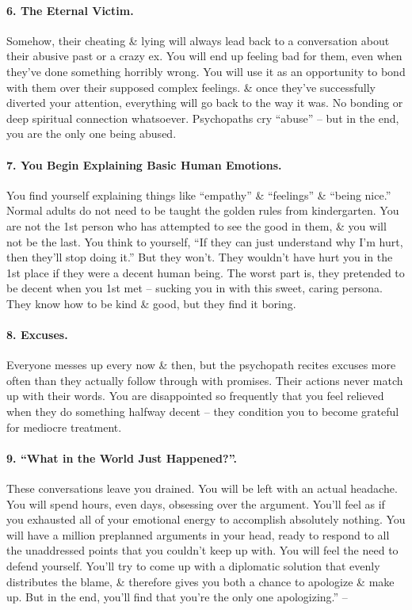 \documentclass{article}
\numberwithin{equation}{section}
\begin{document}
\paragraph{6. The Eternal Victim.} Somehow, their cheating \& lying will always lead back to a conversation about their abusive past or a crazy ex. You will end up feeling bad for them, even when they've done something horribly wrong. You will use it as an opportunity to bond with them over their supposed complex feelings. \& once they've successfully diverted your attention, everything will go back to the way it was. No bonding or deep spiritual connection whatsoever. Psychopaths cry ``abuse'' -- but in the end, you are the only one being abused.

\paragraph{7. You Begin Explaining Basic Human Emotions.} You find yourself explaining things like ``empathy'' \& ``feelings'' \& ``being nice.'' Normal adults do not need to be taught the golden rules from kindergarten. You are not the 1st person who has attempted to see the good in them, \& you will not be the last. You think to yourself, ``If they can just understand why I'm hurt, then they'll stop doing it.'' But they won't. They wouldn't have hurt you in the 1st place if they were a decent human being. The worst part is, they pretended to be decent when you 1st met -- sucking you in with this sweet, caring persona. They know how to be kind \& good, but they find it boring.

\paragraph{8. Excuses.} Everyone messes up every now \& then, but the psychopath recites excuses more often than they actually follow through with promises. Their actions never match up with their words. You are disappointed so frequently that you feel relieved when they do something halfway decent -- they condition you to become grateful for mediocre treatment.

\paragraph{9. ``What in the World Just Happened?''.} These conversations leave you drained. You will be left with an actual headache. You will spend hours, even days, obsessing over the argument. You'll feel as if you exhausted all of your emotional energy to accomplish absolutely nothing. You will have a million preplanned arguments in your head, ready to respond to all the unaddressed points that you couldn't keep up with. You will feel the need to defend yourself. You'll try to come up with a diplomatic solution that evenly distributes the blame, \& therefore gives you both a chance to apologize \& make up. But in the end, you'll find that you're the only one apologizing.'' -- \cite[pp. 43--46]{MacKenzie2015}
\end{document}

